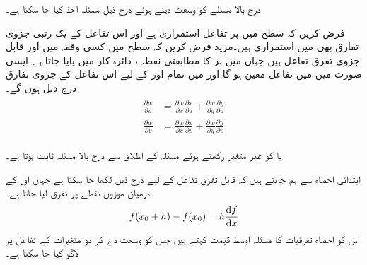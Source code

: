درج بالا مسئلے کو وسعت دیتے ہوئے درج ذیل مسئلہ اخذ کیا جا سکتا ہے۔

فرض کریں کہ  سطح میں   پر تفاعل  استمراری ہے  اور  اس تفاعل کے یک رتبی جزوی تفارق بھی  میں استمراری ہیں۔مزید فرض کریں کہ  سطح میں کسی وقفہ  میں  اور  قابل جزوی تفرق تفاعل ہیں جہاں  میں ہر  کا مطابقتی نقطہ ، دائرہ کار  میں پایا جاتا ہے۔ایسی صورت میں  میں تفاعل   معین ہو گا اور  میں تمام  اور  کے لیے اس تفاعل کے جزوی تفارق  درج ذیل ہوں گے۔
\begin{gather}
\begin{aligned}\label{مساوات_الاحصاء_زنجیری_ترکیب_کلیات}
\frac{\partial w}{\partial u}&=\frac{\partial w}{\partial x}\frac{\partial x}{\partial u}+\frac{\partial w}{\partial y}\frac{\partial y}{\partial u}\\
\frac{\partial w}{\partial v}&=\frac{\partial w}{\partial x}\frac{\partial x}{\partial v}+\frac{\partial w}{\partial y}\frac{\partial y}{\partial v}
\end{aligned}
\end{gather}

 یا  کو غیر متغیر رکھتے ہوئے مسئلہ  کے اطلاق سے  درج بالا مسئلہ ثابت ہوتا ہے۔

ابتدائی احصاء  سے ہم جانتے ہیں کہ قابل تفرق تفاعل  کے لیے درج ذیل لکھا جا سکتا ہے جہاں  اور  کے درمیان موزوں نقطے پر تفرق لیا جاتا ہے۔
\begin{align*}
f(x_0+h)-f(x_0)=h\frac{\dif f}{\dif x}
\end{align*}
اس کو احصاء تفرقیات کا مسئلہ اوسط قیمت کہتے ہیں جس کو  وسعت دے کر  دو متغیرات کے تفاعل پر لاگو  کیا جا سکتا ہے۔

